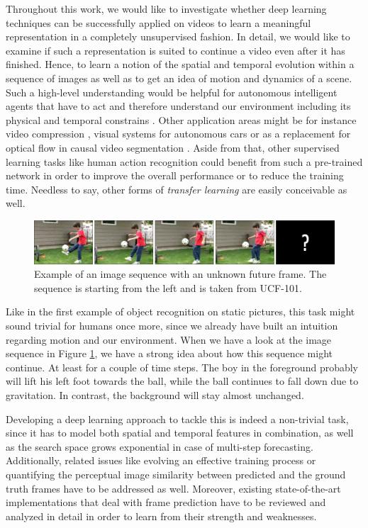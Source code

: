 Throughout this work, we would like to investigate whether deep learning techniques can be successfully applied on videos to learn a meaningful representation in a completely unsupervised fashion. In detail, we would like to examine if such a representation is suited to continue a video even after it has finished. Hence, to learn a notion of the spatial and temporal evolution within a sequence of images as well as to get an idea of motion and dynamics of a scene. Such a high-level understanding would be helpful for autonomous intelligent agents that have to act and therefore understand our environment including its physical and temporal constrains \parencite{unsup_learn_lstm}. Other application areas might be for instance video compression \parencite{frame_interpol}, visual systems for autonomous cars or as a replacement for optical flow in causal video segmentation \parencite{causal_video_seg}. Aside from that, other supervised learning tasks like human action recognition could benefit from such a pre-trained network in order to improve the overall performance or to reduce the training time. Needless to say, other forms of \textit{transfer learning} are easily conceivable as well.

\begin{figure}[htpb]
	\centering
	\includegraphics[width=1.0\linewidth]{figures/ucf-intro/serie1.png} 
	\caption[Image Sequence Example]{Example of an image sequence with an unknown future frame. The sequence is starting from the left and is taken from UCF-101.} \label{fig:intro-seq}
\end{figure}

Like in the first example of object recognition on static pictures, this task might sound trivial for humans once more, since we already have built an intuition regarding motion and our environment. When we have a look at the image sequence in Figure \ref{fig:intro-seq}, we have a strong idea about how this sequence might continue. At least for a couple of time steps. The boy in the foreground probably will lift his left foot towards the ball, while the ball continues to fall down due to gravitation. In contrast, the background will stay almost unchanged.

Developing a deep learning approach to tackle this is indeed a non-trivial task, since it has to model both spatial and temporal features in combination, as well as the search space grows exponential in case of multi-step forecasting. Additionally, related issues like evolving an effective training process or quantifying the perceptual image similarity between predicted and the ground truth frames have to be addressed as well. Moreover, existing state-of-the-art implementations that deal with frame prediction have to be reviewed and analyzed in detail in order to learn from their strength and weaknesses.



